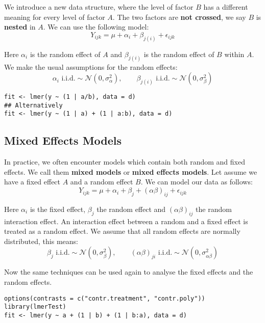 We introduce a new data structure, where the level of factor $B$ has a different meaning for every level of factor $A$. The two factors are \textbf{not crossed}, we say $B$ is \textbf{nested} in $A$. We can use the following model:
$$Y_{ijk} = \mu + \alpha_i + \beta_{j(i)} + \epsilon_{ijk}$$

Here $\alpha_i$ is the random effect of $A$ and $\beta_{j(i)}$ is the random effect of $B$ within $A$. We make the usual assumptions for the random effects:
$$\alpha_i \text{ i.i.d.} \sim \mathcal{N}(0, \sigma_\alpha^2), \qquad \beta_{j(i)} \text{ i.i.d.} \sim \mathcal{N}(0, \sigma_\beta^2)$$

\begin{lstlisting}
fit <- lmer(y ~ (1 | a/b), data = d)
## Alternatively
fit <- lmer(y ~ (1 | a) + (1 | a:b), data = d)
\end{lstlisting}

\subsection{Mixed Effects Models}

In practice, we often encounter models which contain both random and fixed effects. We call them \textbf{mixed models} or \textbf{mixed effects models}. Let assume we have a fixed effect $A$ and a random effect $B$. We can model our data as follows:
$$Y_{ijk} = \mu + \alpha_i + \beta_j + (\alpha \beta)_{ij} + \epsilon_{ijk}$$

Here $\alpha_i$ is the fixed effect, $\beta_j$ the random effect and $(\alpha \beta)_{ij}$ the random interaction effect. An interaction effect between a random and a fixed effect is treated as a random effect. We assume that all random effects are normally distributed, this means:
$$\beta_j \text{ i.i.d.} \sim \mathcal{N}(0, \sigma_\beta^2), \qquad (\alpha\beta)_{ji} \text{ i.i.d.} \sim \mathcal{N}(0, \sigma_{\alpha\beta}^2)$$

Now the same techniques can be used again to analyse the fixed effects and the random effects.
\begin{lstlisting}
options(contrasts = c("contr.treatment", "contr.poly"))
library(lmerTest)
fit <- lmer(y ~ a + (1 | b) + (1 | b:a), data = d)
\end{lstlisting}
